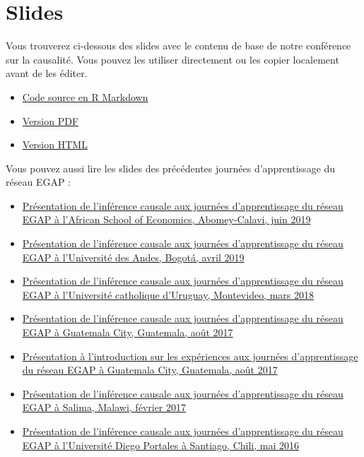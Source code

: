 \documentclass[
  12pt,
]{book}
\begin{document}
\hypertarget{slides-1}{%
\section{Slides}\label{slides-1}}

Vous trouverez ci-dessous des slides avec le contenu de base de notre conférence sur la causalité. Vous pouvez les utiliser directement ou les copier localement avant de les éditer.

\begin{itemize}
\item
  \href{https://egap.github.io/learningdays-resources/Slides/causalinference-slides.Rmd}{Code source en R Markdown}
\item
  \href{https://egap.github.io/learningdays-resources/Slides/causalinference-slides.pdf}{Version PDF}
\item
  \href{https://egap.github.io/learningdays-resources/Slides/causalinference-slides.html}{Version HTML}
\end{itemize}

Vous pouvez aussi lire les slides des précédentes journées d'apprentissage du réseau EGAP :

\begin{itemize}
\item
  \href{https://egap.github.io/learningdays-resources/Slides/Examples/causality-benin.pdf}{Présentation de l'inférence causale aux journées d'apprentissage du réseau EGAP à l'African School of Economics, Abomey-Calavi, juin 2019}
\item
  \href{https://egap.github.io/learningdays-resources/Slides/Examples/causality-bogota.pdf}{Présentation de l'inférence causale aux journées d'apprentissage du réseau EGAP à l'Université des Andes, Bogotá, avril 2019}
\item
  \href{https://egap.github.io/learningdays-resources/Slides/Examples/causality-montevideo.pdf}{Présentation de l'inférence causale aux journées d'apprentissage du réseau EGAP à l'Université catholique d'Uruguay, Montevideo, mars 2018}
\item
  \href{https://egap.github.io/learningdays-resources/Slides/Examples/causality-guatemala.pdf}{Présentation de l'inférence causale aux journées d'apprentissage du réseau EGAP à Guatemala City, Guatemala, août 2017}
\item
  \href{https://egap.github.io/learningdays-resources/Slides/Examples/intro_experiments-guatemala.pdf}{Présentation à l'introduction sur les expériences aux journées d'apprentissage du réseau EGAP à Guatemala City, Guatemala, août 2017}
\item
  \href{https://egap.github.io/learningdays-resources/Slides/Examples/causality-malawi.pdf}{Présentation de l'inférence causale aux journées d'apprentissage du réseau EGAP à Salima, Malawi, février 2017}
\item
  \href{https://egap.github.io/learningdays-resources/Slides/Examples/causality-santiago.pdf}{Présentation de l'inférence causale aux journées d'apprentissage du réseau EGAP à l'Université Diego Portales à Santiago, Chili, mai 2016}
\end{itemize}
\end{document}

